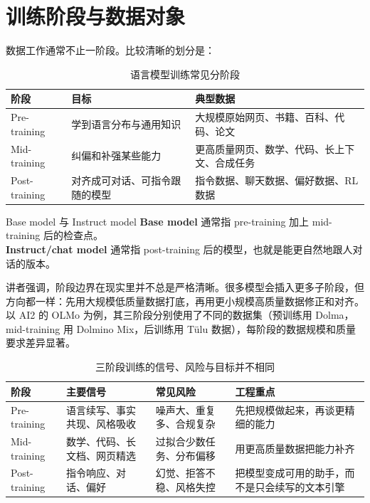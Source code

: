 \section{训练阶段与数据对象}

数据工作通常不止一阶段。比较清晰的划分是：

\begin{table}[H]
\centering
\begin{tabular}{p{}p{}p{}}
\toprule
\textbf{阶段} & \textbf{目标} & \textbf{典型数据} \\
\midrule
Pre-training & 学到语言分布与通用知识 & 大规模原始网页、书籍、百科、代码、论文 \\
Mid-training & 纠偏和补强某些能力 & 更高质量网页、数学、代码、长上下文、合成任务 \\
Post-training & 对齐成可对话、可指令跟随的模型 & 指令数据、聊天数据、偏好数据、RL 数据 \\
\bottomrule
\end{tabular}
\caption{语言模型训练常见分阶段}
\end{table}

\begin{knowledgebox}{Base model 与 Instruct model}
\textbf{Base model} 通常指 pre-training 加上 mid-training 后的检查点。\\
\textbf{Instruct/chat model} 通常指 post-training 后的模型，也就是能更自然地跟人对话的版本。
\end{knowledgebox}

讲者强调，阶段边界在现实里并不总是严格清晰。很多模型会插入更多子阶段，但方向都一样：先用大规模低质量数据打底，再用更小规模高质量数据修正和对齐。以 AI2 的 OLMo 为例，其三阶段分别使用了不同的数据集（预训练用 Dolma，mid-training 用 Dolmino Mix，后训练用 T\"ulu 数据），每阶段的数据规模和质量要求差异显著。

\begin{table}[H]
\centering
\begin{tabular}{p{}p{}p{}p{}}
\toprule
\textbf{阶段} & \textbf{主要信号} & \textbf{常见风险} & \textbf{工程重点} \\
\midrule
Pre-training & 语言续写、事实共现、风格吸收 & 噪声大、重复多、合规复杂 & 先把规模做起来，再谈更精细的能力 \\
Mid-training & 数学、代码、长文档、网页精选 & 过拟合少数任务、分布偏移 & 用更高质量数据把能力补齐 \\
Post-training & 指令响应、对话、偏好 & 幻觉、拒答不稳、风格失控 & 把模型变成可用的助手，而不是只会续写的文本引擎 \\
\bottomrule
\end{tabular}
\caption{三阶段训练的信号、风险与目标并不相同}
\end{table}

